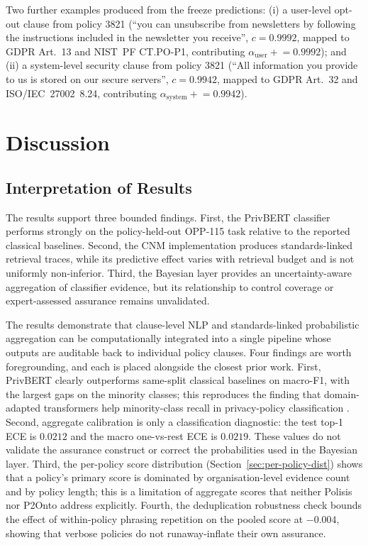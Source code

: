 \documentclass[final,3p,times,twocolumn]{elsarticle}
\begin{document}
	Two further examples produced from the freeze predictions: (i) a user-level
	opt-out clause from policy 3821 (``you can unsubscribe from newsletters by following
	the instructions included in the newsletter you receive'', $c = 0.9992$, mapped
	to GDPR Art.~13 and NIST~PF CT.PO-P1, contributing $\alpha_{\text{user}}\mathrel
	{+}= 0.9992$); and (ii) a system-level security clause from policy 3821 (``All
	information you provide to us is stored on our secure servers'', $c = 0.9942$,
	mapped to GDPR Art.~32 and ISO/IEC~27002~8.24, contributing
	$\alpha_{\text{system}}\mathrel{+}= 0.9942$).

	\section{Discussion}
	\label{sec:discussion}

	\subsection{Interpretation of Results}
	The results support three bounded findings. First, the PrivBERT classifier
	performs strongly on the policy-held-out OPP-115 task relative to the reported
	classical baselines. Second, the CNM implementation produces standards-linked
	retrieval traces, while its predictive effect varies with retrieval budget and
	is not uniformly non-inferior. Third, the Bayesian layer provides an
	uncertainty-aware aggregation of classifier evidence, but its relationship to
	control coverage or expert-assessed assurance remains unvalidated.

	The results demonstrate that clause-level NLP and standards-linked
	probabilistic aggregation can be computationally integrated into a single
	pipeline whose outputs are auditable back to individual policy clauses. Four findings
	are worth foregrounding, and each is placed alongside the closest prior work. 
	First, PrivBERT clearly outperforms same-split classical baselines on macro-F1,
	with the largest gaps on the minority classes; this reproduces the finding that
	domain-adapted transformers help minority-class recall in privacy-policy classification
	\citep{srinath2021privaseer,muralitharan2024privacybertlstm}. Second,
	aggregate calibration is only a classification diagnostic: the test top-1 ECE is
	$0.0212$ and the macro one-vs-rest ECE is $0.0219$. These values do not validate
	the assurance construct or correct the probabilities used in the Bayesian layer.
	Third, the per-policy
	score distribution (Section~\ref{sec:per-policy-dist}) shows that a policy's
	primary score is dominated by organisation-level evidence count and by policy
	length; this is a limitation of aggregate scores that neither Polisis \citep{harkous2018polisis}
	nor P2Onto \citep{novikova2025privacyrisks} address explicitly. Fourth, the deduplication
	robustness check bounds the effect of within-policy phrasing repetition on the
	pooled score at $-0.004$, showing that verbose policies do not runaway-inflate
	their own assurance.
\end{document}
